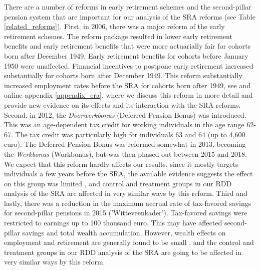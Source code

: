 \documentclass[12pt,a4paper]{article}
\begin{document}
There are a number of reforms in early retirement schemes and the second-pillar pension system that are important for our analysis of the SRA reforms (see Table \ref{related_reforms}). First, in 2006, there was a major reform of the early retirement schemes.
The reform package resulted in lower early retirement benefits and early retirement benefits that were more actuarially fair for cohorts born after December 1949. Early retirement benefits for cohorts before January 1950 were unaffected.
Financial incentives to postpone early retirement increased substantially for cohorts born after December 1949. This reform substantially increased employment rates before the SRA for cohorts born after 1949, see \cite{lindeboom_montizaan_2020} and online appendix \ref{appendix_era}, where we discuss this reform in more detail and provide new evidence on its effects and its interaction with the SRA reforms. %
Second, in 2012, the \textit{Doorwerkbonus} (Deferred Pension Bonus) was introduced. This was an age-dependent tax credit for working individuals in the age range 62-67. The tax credit was particularly high for individuals 63 and 64 (up to 4,600 euro). The Deferred Pension Bonus was reformed somewhat in 2013, becoming the \textit{Werkbonus} (Workbonus), but was then phased out between 2015 and 2018. We expect that this reform hardly affects our results, since it mostly targets individuals a few years before the SRA, the available evidence suggests the effect on this group was limited \citep{CPB_2020_AOW}, and control and treatment groups in our RDD analysis of the SRA are affected in very similar ways by this reform. 
Third and lastly, there was a reduction in the maximum accrual rate of tax-favored savings for second-pillar pensions in 2015 ('Witteveenkader'). Tax-favored savings were restricted to earnings up to 100 thousand euro. This may have affected second-pillar savings and total wealth accumulation. However, wealth effects on employment and retirement are generally found to be small \cite[see e.g.][]{van_erp_non-financial_2014}, and the control and treatment groups in our RDD analysis of the SRA are going to be affected in very similar ways by this reform.
\end{document}

